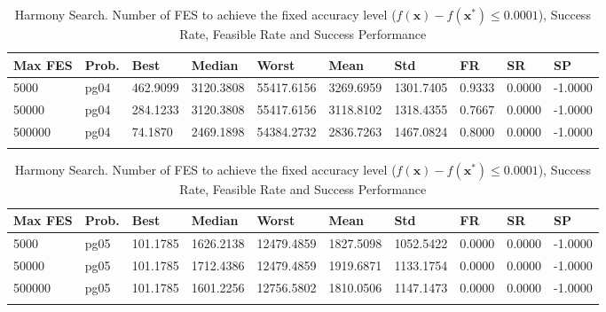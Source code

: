 \documentclass[10pt, a4paper]{book}
\begin{document}
\begin{center}
\begin{longtable}{l l l l l l l l l l}
\textbf{Max FES} & \textbf{Prob.} & \textbf{Best} & \textbf{Median} & \textbf{Worst} & \textbf{Mean} & \textbf{Std} & \textbf{FR} & \textbf{SR} & \textbf{SP} \\
\hline
5000 & pg04 & 462.9099 & 3120.3808 & 55417.6156 & 3269.6959 & 1301.7405 & 0.9333 & 0.0000 & -1.0000 \\
50000 & pg04 & 284.1233 & 3120.3808 & 55417.6156 & 3118.8102 & 1318.4355 & 0.7667 & 0.0000 & -1.0000 \\
500000 & pg04 & 74.1870 & 2469.1898 & 54384.2732 & 2836.7263 & 1467.0824 & 0.8000 & 0.0000 & -1.0000 \\

\caption{ Harmony Search. Number of FES to achieve the fixed accuracy level ($f(\mathbf{x}) - f(\mathbf{x}^{*}) \leq 0.0001$), Success Rate, Feasible Rate and Success Performance }
\end{longtable}
\end{center}

\begin{center}
\begin{longtable}{l l l l l l l l l l}
\textbf{Max FES} & \textbf{Prob.} & \textbf{Best} & \textbf{Median} & \textbf{Worst} & \textbf{Mean} & \textbf{Std} & \textbf{FR} & \textbf{SR} & \textbf{SP} \\
\hline
5000 & pg05 & 101.1785 & 1626.2138 & 12479.4859 & 1827.5098 & 1052.5422 & 0.0000 & 0.0000 & -1.0000 \\
50000 & pg05 & 101.1785 & 1712.4386 & 12479.4859 & 1919.6871 & 1133.1754 & 0.0000 & 0.0000 & -1.0000 \\
500000 & pg05 & 101.1785 & 1601.2256 & 12756.5802 & 1810.0506 & 1147.1473 & 0.0000 & 0.0000 & -1.0000 \\

\caption{ Harmony Search. Number of FES to achieve the fixed accuracy level ($f(\mathbf{x}) - f(\mathbf{x}^{*}) \leq 0.0001$), Success Rate, Feasible Rate and Success Performance }
\end{longtable}
\end{center}
\end{document}
